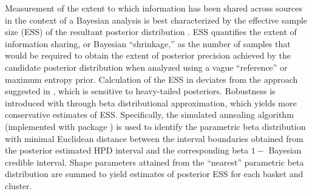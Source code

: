 Measurement of the extent to which information has been shared across sources in the context of a Bayesian analysis is best characterized by the effective sample size (ESS) of the resultant posterior distribution \cite{hobbs2013, murray2015}. ESS quantifies the extent of information sharing, or Bayesian ``shrinkage,'' as the number of samples that would be required to obtain the extent of posterior precision achieved by the candidate posterior distribution when analyzed using a vague ``reference'' or maximum entropy prior. Calculation of the ESS in  deviates from the approach suggested in \cite{hobbs2018monitor}, which is sensitive to heavy-tailed posteriors. Robustness is introduced with  through beta distributional approximation, which yields more conservative estimates of ESS. Specifically, the simulated annealing algorithm (implemented with  package \cite{gensa}) is used to identify the parametric beta distribution with minimal Euclidean distance between the interval boundaries obtained from the posterior estimated HPD interval and the corresponding beta $1-$ Bayesian credible interval. Shape parameters attained from the ``nearest'' parametric beta distribution are summed to yield estimates of posterior ESS for each basket and cluster.


